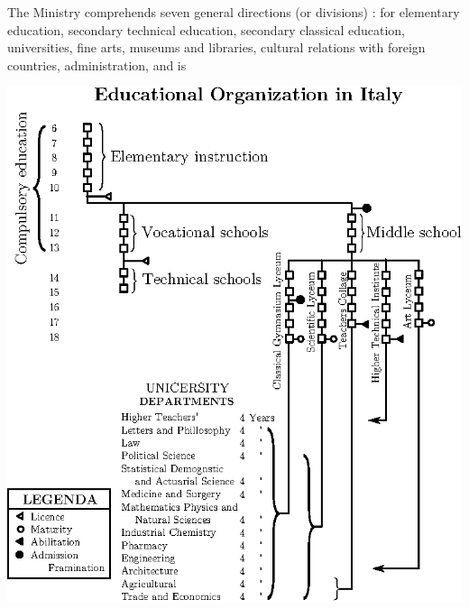 The Ministry comprehends seven general directions (or divisions) : for elementary education, secondary technical education, secondary classical education, universities, fine arts, museums and libraries, cultural relations with foreign countries, administration, and is 
\begin{table}[H]
\centering
\includegraphics{figure/tab_01.eps}
\caption{}\label{chap9-tabI}
\end{table}

\newpage

